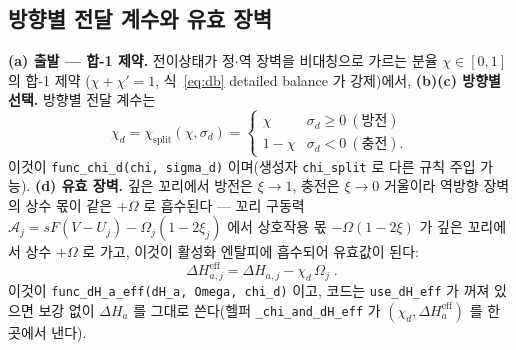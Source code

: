 \documentclass[11pt,a4paper]{article}
\newcommand{\eff}{\mathrm{eff}}
\newcommand{\code}[1]{\texttt{#1}}
\begin{document}
\subsection{방향별 전달 계수와 유효 장벽}
\textbf{(a) 출발 — 합-1 제약.} 전이상태가 정$\cdot$역 장벽을 비대칭으로 가르는 분율 $\chi\in[0,1]$ 의 합-1 제약
($\chi+\chi'=1$, 식~\eqref{eq:db} detailed balance 가 강제)에서, \textbf{(b)(c) 방향별 선택.} 방향별 전달 계수는
\begin{equation}
\chi_d=\chi_\mathrm{split}(\chi,\sigma_d)=
\begin{cases}\chi & \sigma_d\ge0\ (\text{방전})\\ 1-\chi & \sigma_d<0\ (\text{충전}).\end{cases}
\label{eq:chid}
\end{equation}
이것이 \code{func\_chi\_d(chi, sigma\_d)} 이며(생성자 \code{chi\_split} 로 다른 규칙 주입 가능). \textbf{(d) 유효 장벽.}
깊은 꼬리에서 방전은 $\xi\to1$, 충전은 $\xi\to0$ 거울이라 역방향 장벽의 상수 몫이 같은 $+\Omega$ 로 흡수된다 — 꼬리
구동력 $\mathcal A_j=sF(V-U_j)-\Omega_j(1-2\xi_j)$ 에서 상호작용 몫 $-\Omega(1-2\xi)$ 가 깊은 꼬리에서 상수 $+\Omega$ 로
가고, 이것이 활성화 엔탈피에 흡수되어 유효값이 된다:
\begin{equation}
\boxed{\;\Delta H_{a,j}^\eff=\Delta H_{a,j}-\chi_d\,\Omega_j\;.}
\label{eq:dHeff}
\end{equation}
이것이 \code{func\_dH\_a\_eff(dH\_a, Omega, chi\_d)} 이고, 코드는 \code{use\_dH\_eff} 가 꺼져 있으면 보강 없이
$\Delta H_a$ 를 그대로 쓴다(헬퍼 \code{\_chi\_and\_dH\_eff} 가 $(\chi_d,\Delta H_a^\eff)$ 를 한 곳에서 낸다).
\end{document}
